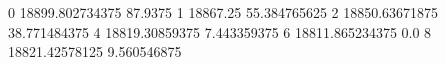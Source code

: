 0 18899.802734375 87.9375
1 18867.25 55.384765625
2 18850.63671875 38.771484375
4 18819.30859375 7.443359375
6 18811.865234375 0.0
8 18821.42578125 9.560546875
